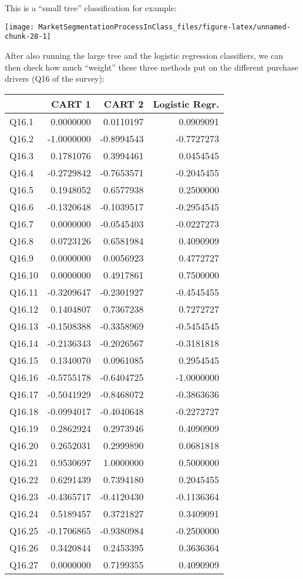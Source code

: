 \documentclass[
]{article}
\begin{document}
This is a ``small tree'' classification for example:

\begin{center}\texttt{[image: MarketSegmentationProcessInClass\_files/figure-latex/unnamed-chunk-28-1]} \end{center}

After also running the large tree and the logistic regression
classifiers, we can then check how much ``weight'' these three methods
put on the different purchase drivers (Q16 of the survey):

\begin{center}
\begin{longtable}{lrrr}
\toprule
  & CART 1 & CART 2 & Logistic Regr.\\
\midrule
Q16.1 & 0.0000000 & 0.0110197 & 0.0909091\\
Q16.2 & -1.0000000 & -0.8994543 & -0.7727273\\
Q16.3 & 0.1781076 & 0.3994461 & 0.0454545\\
Q16.4 & -0.2729842 & -0.7653571 & -0.2045455\\
Q16.5 & 0.1948052 & 0.6577938 & 0.2500000\\
\addlinespace
Q16.6 & -0.1320648 & -0.1039517 & -0.2954545\\
Q16.7 & 0.0000000 & -0.0545403 & -0.0227273\\
Q16.8 & 0.0723126 & 0.6581984 & 0.4090909\\
Q16.9 & 0.0000000 & 0.0056923 & 0.4772727\\
Q16.10 & 0.0000000 & 0.4917861 & 0.7500000\\
\addlinespace
Q16.11 & -0.3209647 & -0.2301927 & -0.4545455\\
Q16.12 & 0.1404807 & 0.7367238 & 0.7272727\\
Q16.13 & -0.1508388 & -0.3358969 & -0.5454545\\
Q16.14 & -0.2136343 & -0.2026567 & -0.3181818\\
Q16.15 & 0.1340070 & 0.0961085 & 0.2954545\\
\addlinespace
Q16.16 & -0.5755178 & -0.6404725 & -1.0000000\\
Q16.17 & -0.5041929 & -0.8468072 & -0.3863636\\
Q16.18 & -0.0994017 & -0.4040648 & -0.2272727\\
Q16.19 & 0.2862924 & 0.2973946 & 0.4090909\\
Q16.20 & 0.2652031 & 0.2999890 & 0.0681818\\
\addlinespace
Q16.21 & 0.9530697 & 1.0000000 & 0.5000000\\
Q16.22 & 0.6291439 & 0.7394180 & 0.2045455\\
Q16.23 & -0.4365717 & -0.4120430 & -0.1136364\\
Q16.24 & 0.5189457 & 0.3721827 & 0.3409091\\
Q16.25 & -0.1706865 & -0.9380984 & -0.2500000\\
\addlinespace
Q16.26 & 0.3420844 & 0.2453395 & 0.3636364\\
Q16.27 & 0.0000000 & 0.7199355 & 0.4090909\\
\bottomrule
\end{longtable}\end{center}
\end{document}
